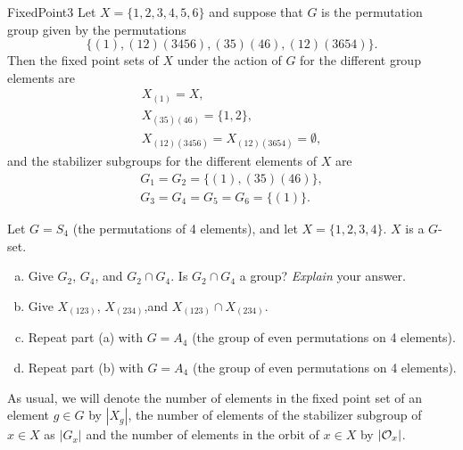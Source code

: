 \begin{example}{FixedPoint3}
Let $X = \{1, 2, 3, 4, 5, 6\}$ and suppose that $G$ is the permutation
group given by the permutations 
$$\{(1), (1 2)(3 4 5 6), (3 5)(4 6), (1 2)( 3 6 5 4)\}.$$
Then the fixed point sets of $X$ under the action of $G$ for the different group elements are
$$
\begin{array}{c}
X_{(1)} = X, \\
X_{(3 5)(4 6)} = \{1,2\}, \\
X_{(1 2)(3 4 5 6)} = X_{(1 2)(3 6 5 4)} = \emptyset,
\end{array}
$$
and the stabilizer subgroups for the different elements of $X$ are
$$
\begin{array}{c}
G_1 = G_2 = \{(1), (3 5)(4 6) \}, \\
G_3 = G_4 = G_5 = G_6 = \{(1)\}.
\end{array}
$$
\end{example}


\begin{exercise}{}
Let $G = S_4$ (the permutations of 4 elements), and let $X = \{1,2,3,4\}$.  $X$ is a $G$-set.
\begin{enumerate}[(a)]
\item
Give $G_2$, $G_4$, and $G_2 \cap G_4$.  Is $G_2 \cap G_4$ a group? \emph{Explain} your answer.
\item
Give $X_{(123)}$, $X_{(234)}$,and  $X_{(123)} \cap X_{(234)}$.
\item
Repeat part (a) with $G=A_4$ (the group of even permutations on 4 elements).
\item
Repeat part (b) with $G=A_4$ (the group of even permutations on 4 elements).
\end{enumerate}
\end{exercise} 
As usual, we will denote the number of elements in the fixed point set of an
element $g \in G$ by $|X_g|$, the number of elements of the stabilizer subgroup of $x\in X$ as $|G_x|$ and the number of elements in the orbit of $x \in X$ by $|{\cal O}_x|$.

